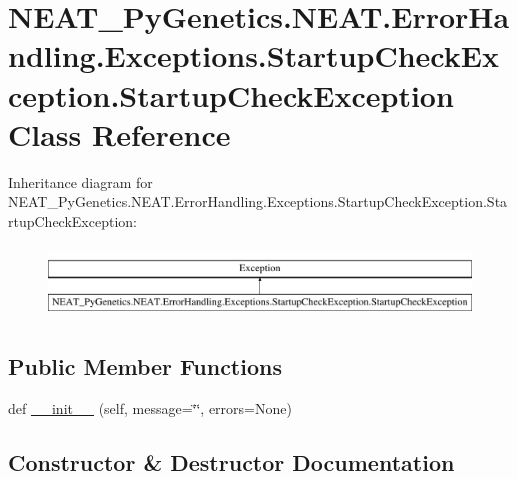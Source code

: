 \hypertarget{classNEAT__PyGenetics_1_1NEAT_1_1ErrorHandling_1_1Exceptions_1_1StartupCheckException_1_1StartupCheckException}{}\section{N\+E\+A\+T\+\_\+\+Py\+Genetics.\+N\+E\+A\+T.\+Error\+Handling.\+Exceptions.\+Startup\+Check\+Exception.\+Startup\+Check\+Exception Class Reference}
\label{classNEAT__PyGenetics_1_1NEAT_1_1ErrorHandling_1_1Exceptions_1_1StartupCheckException_1_1StartupCheckException}
Inheritance diagram for N\+E\+A\+T\+\_\+\+Py\+Genetics.\+N\+E\+A\+T.\+Error\+Handling.\+Exceptions.\+Startup\+Check\+Exception.\+Startup\+Check\+Exception\+:\begin{figure}[H]
\begin{center}
\leavevmode
\includegraphics[height=1.931034cm]{classNEAT__PyGenetics_1_1NEAT_1_1ErrorHandling_1_1Exceptions_1_1StartupCheckException_1_1StartupCheckException}
\end{center}
\end{figure}
\subsection*{Public Member Functions}
\begin{DoxyCompactItemize}
\item 
def \hyperlink{classNEAT__PyGenetics_1_1NEAT_1_1ErrorHandling_1_1Exceptions_1_1StartupCheckException_1_1StartupCheckException_a39cbd39c3a77f3acc9c3feb3bfb84d7e}{\+\_\+\+\_\+init\+\_\+\+\_\+} (self, message=\char`\"{}\char`\"{}, errors=None)
\end{DoxyCompactItemize}


\subsection{Constructor \& Destructor Documentation}
